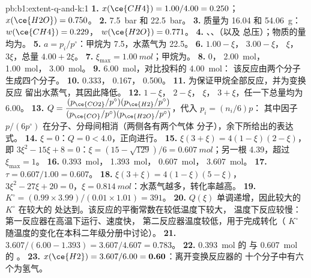 \begin{solution}{pb:b1:extent-q-and-k:1}
\textbf{1.} $x(\ce{CH4}) = 1.00/4.00 = 0.250$；$x(\ce{H2O}) = 0.750$。
\textbf{2.} \qty{7.5}{bar} 和 \qty{22.5}{bar}。
\textbf{3.} 质量为 16.04 和 \qty{54.06}{g}：$w(\ce{CH4}) = 0.229$，
$w(\ce{H2O}) = 0.771$。
\textbf{4.} 、、（以及
总压）；物质的量均为。
\textbf{5.} $a = p_i/p^\circ$：甲烷为 7.5，水蒸气为 22.5。
\textbf{6.}  $1.00 - \xi$， $3.00 - \xi$， $\xi$，
 $3\xi$，总量 $4.00 + 2\xi$。
\textbf{7.} $\xi_{\max} = \qty{1.00}{mol}$；甲烷为。
\textbf{8.}  0， \qty{2.00}{mol}， \qty{1.00}{mol}，
 \qty{3.00}{mol}。
\textbf{9.} \qty{6.00}{mol}，对比投料的 \qty{4.00}{mol}：
该反应由两个分子生成四个分子。
\textbf{10.}  0.333， 0.167， 0.500。
\textbf{11.} 为保证甲烷全部反应，并为变换反应
留出水蒸气，其因此降低。
\textbf{12.}  $1 - \xi$， $2 - \xi$， $\xi$，
$3 + \xi$，任一下总量均为 6.00。
\textbf{13.} $Q = \dfrac{(p_{\ce{CO2}}/p^\circ)(p_{\ce{H2}}/p^\circ)}
{(p_{\ce{CO}}/p^\circ)(p_{\ce{H2O}}/p^\circ)}$，代入 $p_i = (n_i/6)p$：
其中因子 $p/(6p^\circ)$ 在分子、分母间相消（两侧各有两个气体
分子），余下所给出的表达式。
\textbf{14.} $\xi = 0$：$Q = 0 < 4.0$，正向进行。
\textbf{15.} $\xi(3 + \xi) = 4(1 - \xi)(2 - \xi)$，即 $3\xi^2 - 15\xi +
8 = 0$：$\xi = (15 - \sqrt{129})/6 = \qty{0.607}{mol}$；另一根
4.39，超过 $\xi_{\max} = 1$。
\textbf{16.}  \qty{0.393}{mol}， \qty{1.393}{mol}，
 \qty{0.607}{mol}， \qty{3.607}{mol}。
\textbf{17.} $\tau = 0.607/1.00 = 0.607$。
\textbf{18.} $\xi(3 + \xi) = 4(1 - \xi)(5 - \xi)$，$3\xi^2 - 27\xi + 20 =
0$，$\xi = \qty{0.814}{mol}$：水蒸气越多，转化率越高。
\textbf{19.} $K^\circ = (0.99 \times 3.99)/(0.01 \times 1.01) = 391$。
\textbf{20.} $Q(\xi)$ 单调递增，因此较大的 $K^\circ$ 在较大的
处达到。该反应的平衡常数在较低温度下较大，
温度下反应较慢：第一反应器在高温下运行、速度快，
第二反应器温度较低，用于完成转化（
$K^\circ$ 随温度的变化在本科二年级分册中讨论）。
\textbf{21.} $3.607/(6.00 - 1.393) = 3.607/4.607 = 0.783$。
\textbf{22.} \qty{0.393}{mol} 的  与 \qty{0.607}{mol} 的 。
\textbf{23.} $x(\ce{H2}) = 3.607/6.00 = \textbf{0.60}$：离开变换反应器的
十个分子中有六个为氢气。
\end{solution}
